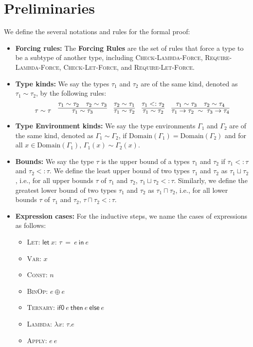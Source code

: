 \documentclass[peerreview, 10pt]{IEEEtran}
\newcommand{\lett}[4]{\ensuremath{\mathsf{let}\ #1\mathsf{:}\,#2\ \mathsf{=}\ #3\ \mathsf{in}\ #4}}
\newcommand{\binop}[2]{\ensuremath{#1\ \mathsf{\oplus}\ #2}}
\newcommand{\ternary}[3]{\ensuremath{\mathsf{if0}\ #1\ \mathsf{then}\ #2\ \mathsf{else}\ #3}}
\newcommand{\funct}[3]{\ensuremath{\lambda #1\mathsf{:}\,#2.#3}}
\newcommand{\apply}[2]{\ensuremath{#1\ #2}}
\newcommand{\arrowt}[2]{\ensuremath{{#1}\rightarrow{#2}}}
\begin{document}
\appendix

\newtheorem{lemma}{Lemma}
\newtheorem{theorem}{Theorem}

\section*{Preliminaries}

We define the several notations and rules for the formal proof:

\begin{itemize}
    \item \textbf{Forcing rules:} The \textbf{Forcing Rules} are the set of rules that force a type to be a subtype of another type, including \textsc{Check-Lambda-Force}, \textsc{Require-Lambda-Force}, \textsc{Check-Let-Force}, and \textsc{Require-Let-Force}.
    \item \textbf{Type kinds:} We say the types $\tau_1$ and $\tau_2$ are of the same kind, denoted as $\tau_1 \sim \tau_2$, by the following rules:
    \[\tau\sim\tau\quad\infer{\tau_1\sim\tau_3}{\tau_1\sim\tau_2\quad\tau_2\sim\tau_3}\quad\infer{\tau_1\sim\tau_2}{\tau_2\sim\tau_1}\quad\infer{\tau_1\sim\tau_2}{\tau_1<:\tau_2}\quad\infer{\arrowt{\tau_1}{\tau_2}\;\sim\;\arrowt{\tau_3}{\tau_4}}{\tau_1\sim\tau_3\quad\tau_2\sim\tau_4}\]
    \item \textbf{Type Environment kinds:} We say the type environments $\Gamma_1$ and $\Gamma_2$ are of the same kind, denoted as $\Gamma_1 \sim \Gamma_2$, if $\text{Domain}(\Gamma_1) = \text{Domain}(\Gamma_2)$ and for all $x \in \text{Domain}(\Gamma_1)$, $\Gamma_1(x) \sim \Gamma_2(x)$.
    \item \textbf{Bounds:} We say the type $\tau$ is the upper bound of a types $\tau_1$ and $\tau_2$ if $\tau_1 <: \tau$ and $\tau_2 <: \tau$. We define the least upper bound of two types $\tau_1$ and $\tau_2$ as $\tau_1 \sqcup \tau_2$, i.e., for all upper bounds $\tau$ of $\tau_1$ and $\tau_2$, $\tau_1 \sqcup \tau_2 <: \tau$. Similarly, we define the greatest lower bound of two types $\tau_1$ and $\tau_2$ as $\tau_1 \sqcap \tau_2$, i.e., for all lower bounds $\tau$ of $\tau_1$ and $\tau_2$, $\tau \sqcap \tau_2 <: \tau$.
    \item \textbf{Expression cases:} For the inductive steps, we name the cases of expressions as follows:
    \begin{itemize}
        \item \textsc{Let}: \lett{x}{\tau}{e}{e}
        \item \textsc{Var}: $x$
        \item \textsc{Const}: $n$
        \item \textsc{BinOp}: \binop{e}{e}
        \item \textsc{Ternary}: \ternary{e}{e}{e}
        \item \textsc{Lambda}: \funct{x}{\tau}{e}
        \item \textsc{Apply}: \apply{e}{e}
    \end{itemize}


\end{itemize}
\end{document}
